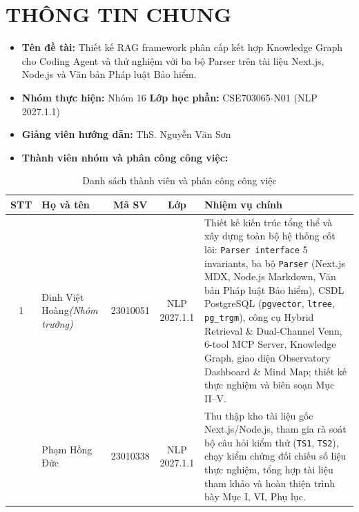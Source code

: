 \section{THÔNG TIN CHUNG}

\begin{itemize}
    \item \textbf{Tên đề tài:} Thiết kế RAG framework phân cấp kết hợp Knowledge Graph cho Coding Agent và thử nghiệm với ba bộ Parser trên tài liệu Next.js, Node.js và Văn bản Pháp luật Bảo hiểm.
    \item \textbf{Nhóm thực hiện:} Nhóm 16 \hspace{1.5cm} \textbf{Lớp học phần:} CSE703065-N01 (NLP 2027.1.1)
    \item \textbf{Giảng viên hướng dẫn:} ThS. Nguyễn Văn Sơn
    \item \textbf{Thành viên nhóm và phân công công việc:}
\end{itemize}

\begin{table}[H]
\centering
\caption{Danh sách thành viên và phân công công việc}
\label{tab:members}
\footnotesize\setlength{\tabcolsep}{4pt}\begin{tabularx}{\textwidth}{cp{3.5cm}cc>{\raggedright\arraybackslash}X}
\toprule
\textbf{STT} & \textbf{Họ và tên} & \textbf{Mã SV} & \textbf{Lớp} & \textbf{Nhiệm vụ chính} \\
\midrule
1 & Đinh Việt Hoàng\newline \textit{(Nhóm trưởng)} & 23010051 & NLP 2027.1.1 & Thiết kế kiến trúc tổng thể và xây dựng toàn bộ hệ thống cốt lõi: \texttt{Parser interface} 5 invariants, ba bộ \texttt{Parser} (Next.js MDX, Node.js Markdown, Văn bản Pháp luật Bảo hiểm), CSDL PostgreSQL (\texttt{pgvector}, \texttt{ltree}, \texttt{pg\_trgm}), công cụ Hybrid Retrieval \& Dual-Channel Venn, 6-tool MCP Server, Knowledge Graph, giao diện Observatory Dashboard \& Mind Map; thiết kế thực nghiệm và biên soạn Mục II--V. \\
\addlinespace[2pt]
2 & Phạm Hồng Đức & 23010338 & NLP 2027.1.1 & Thu thập kho tài liệu gốc Next.js/Node.js, tham gia rà soát bộ câu hỏi kiểm thử (\texttt{TS1}, \texttt{TS2}), chạy kiểm chứng đối chiếu số liệu thực nghiệm, tổng hợp tài liệu tham khảo và hoàn thiện trình bày Mục I, VI, Phụ lục. \\
\bottomrule
\end{tabularx}
\end{table}
